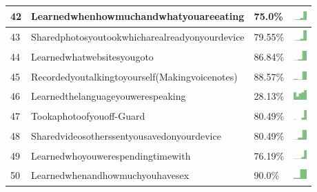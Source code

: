 \documentclass[a4paper,12pt]{article}
\begin{document}
\begin{longtable}{| p{0.5cm} | p{7cm} | p{1cm} | c |}
42 & Learnedwhenhowmuchandwhatyouareeating & 75.0\% & \includegraphics[width = 0.5cm, height = 0.5cm]{learnedwhenhowmuchandwhatyouareeatingWORKCONTACTS} \\ \hline 
43 & Sharedphotosyoutookwhicharealreadyonyourdevice & 79.55\% & \includegraphics[width = 0.5cm, height = 0.5cm]{sharedphotosyoutookwhicharealreadyonyourdeviceWORKCONTACTS} \\ \hline 
44 & Learnedwhatwebsitesyougoto & 86.84\% & \includegraphics[width = 0.5cm, height = 0.5cm]{learnedwhatwebsitesyougotoWORKCONTACTS} \\ \hline 
45 & Recordedyoutalkingtoyourself(Makingvoicenotes) & 88.57\% & \includegraphics[width = 0.5cm, height = 0.5cm]{recordedyoutalkingtoyourself(makingvoicenotes)WORKCONTACTS} \\ \hline 
46 & Learnedthelanguageyouwerespeaking & 28.13\% & \includegraphics[width = 0.5cm, height = 0.5cm]{learnedthelanguageyouwerespeakingWORKCONTACTS} \\ \hline 
47 & Tookaphotoofyouoff-Guard & 80.49\% & \includegraphics[width = 0.5cm, height = 0.5cm]{tookaphotoofyouoff-guardWORKCONTACTS} \\ \hline 
48 & Sharedvideosotherssentyousavedonyourdevice & 80.49\% & \includegraphics[width = 0.5cm, height = 0.5cm]{sharedvideosotherssentyousavedonyourdeviceWORKCONTACTS} \\ \hline 
49 & Learnedwhoyouwerespendingtimewith & 76.19\% & \includegraphics[width = 0.5cm, height = 0.5cm]{learnedwhoyouwerespendingtimewithWORKCONTACTS} \\ \hline 
50 & Learnedwhenandhowmuchyouhavesex & 90.0\% & \includegraphics[width = 0.5cm, height = 0.5cm]{learnedwhenandhowmuchyouhavesexWORKCONTACTS} \\ \hline 

\end{longtable}
\end{document}
